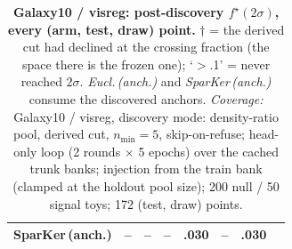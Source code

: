 \begin{table}[t]
\begin{tabular}{lcccccc c}
\quad SparKer\,(anch.) & -- & -- & -- & .030 & -- & .030 \\
\bottomrule
\end{tabular}
\caption{\textbf{Galaxy10 / visreg: post-discovery $f^\star(2\sigma)$, every (arm, test, draw) point.} $\dagger$ = the derived cut had declined at the crossing fraction (the space there is the frozen one); `$>$.1' = never reached $2\sigma$.  \emph{Eucl.\,(anch.)} and \emph{SparKer\,(anch.)} consume the discovered anchors. \emph{Coverage:} Galaxy10 / visreg, discovery mode: density-ratio pool, derived cut, $n_{\min}{=}5$, skip-on-refuse; head-only loop (2 rounds $\times$ 5 epochs) over the cached trunk banks; injection from the train bank (clamped at the holdout pool size); 200 null / 50 signal toys; 172 (test, draw) points.}
\label{tab:sigma_galaxy_post_visreg}
\end{table}
